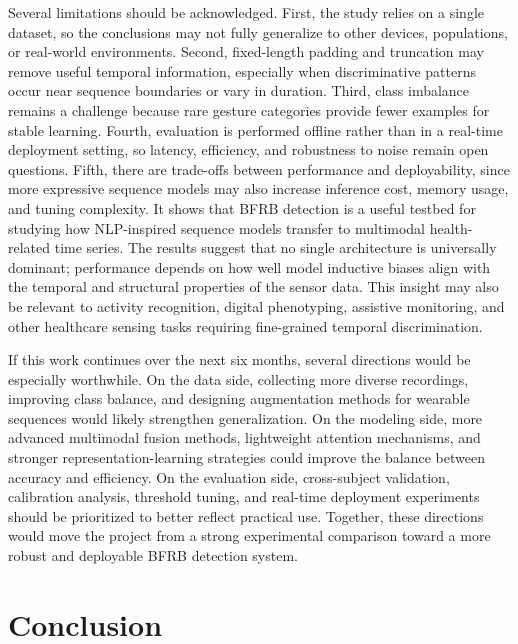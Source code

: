 \documentclass[conference]{IEEEtran}
\begin{document}
Several limitations should be acknowledged. First, the study relies on a single dataset, so the conclusions may not fully generalize to other devices, populations, or real-world environments. Second, fixed-length padding and truncation may remove useful temporal information, especially when discriminative patterns occur near sequence boundaries or vary in duration. Third, class imbalance remains a challenge because rare gesture categories provide fewer examples for stable learning. Fourth, evaluation is performed offline rather than in a real-time deployment setting, so latency, efficiency, and robustness to noise remain open questions. Fifth, there are trade-offs between performance and deployability, since more expressive sequence models may also increase inference cost, memory usage, and tuning complexity. It shows that BFRB detection is a useful testbed for studying how NLP-inspired sequence models transfer to multimodal health-related time series. The results suggest that no single architecture is universally dominant; performance depends on how well model inductive biases align with the temporal and structural properties of the sensor data. This insight may also be relevant to activity recognition, digital phenotyping, assistive monitoring, and other healthcare sensing tasks requiring fine-grained temporal discrimination.

If this work continues over the next six months, several directions would be especially worthwhile. On the data side, collecting more diverse recordings, improving class balance, and designing augmentation methods for wearable sequences would likely strengthen generalization. On the modeling side, more advanced multimodal fusion methods, lightweight attention mechanisms, and stronger representation-learning strategies could improve the balance between accuracy and efficiency. On the evaluation side, cross-subject validation, calibration analysis, threshold tuning, and real-time deployment experiments should be prioritized to better reflect practical use. Together, these directions would move the project from a strong experimental comparison toward a more robust and deployable BFRB detection system.

\clearpage
\section{Conclusion}
\end{document}
